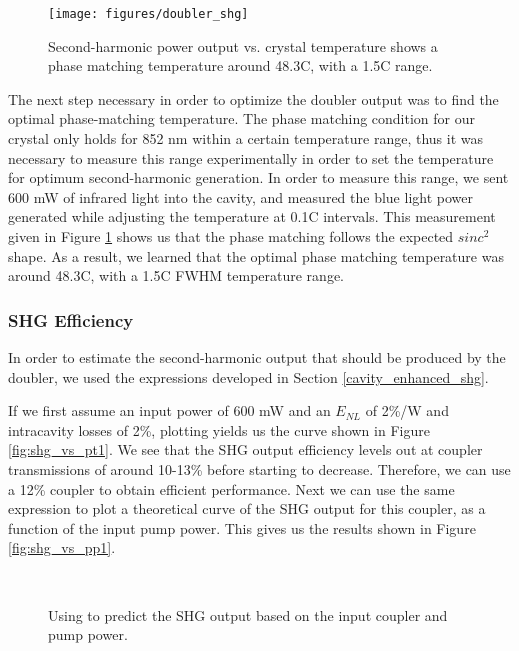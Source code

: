 \begin{figure}[!ht] 
 \centering 
 \texttt{[image: figures/doubler\_shg]} 
 \caption[SHG output vs. temperature]{Second-harmonic power output vs. crystal temperature shows a phase matching temperature around 48.3\textdegree C, with a 1.5\textdegree C range.} 
 \label{fig:doubler_shg} 
\end{figure}

 
The next step necessary in order to optimize the doubler output was to find the optimal phase-matching temperature.  The phase matching condition for our crystal only holds for 852 nm within a certain temperature range,  thus it was necessary to measure this range experimentally in order to set the temperature for optimum second-harmonic generation.  In order to measure this range, we sent 600 mW of infrared light into the cavity, and measured the blue light power generated while adjusting the temperature at 0.1\textdegree C intervals.  This measurement given in Figure \ref{fig:doubler_shg} shows us that the phase matching follows the expected $sinc^2$ shape.  As a result, we learned that the optimal phase matching temperature was around 48.3\textdegree C, with a 1.5\textdegree C FWHM temperature range.  

       

\subsubsection{SHG Efficiency}
\label{shg_efficiency} 

In order to estimate the second-harmonic output that should be produced by the
doubler, we used the expressions developed in Section
\ref{cavity_enhanced_shg}.

If we first assume an input power of 600 mW and an $E_{NL}$ of 2\%/W and
intracavity losses of 2\%, plotting  yields us the curve shown
in Figure \ref{fig:shg_vs_pt1}.  We see that the SHG output efficiency levels
out at coupler transmissions of around 10-13\% before starting to decrease.  Therefore, we can use a 12\% coupler to obtain efficient performance.  Next we can use the same expression to plot a theoretical curve of the SHG output for this coupler, as a function of the input pump power.  This gives us the results shown in Figure \ref{fig:shg_vs_pp1}.

\begin{figure}[!ht]
  \centering
   \\
  \caption[SHG output efficiency vs input coupler and pump power]{Using
 to predict the SHG output based on the input coupler and pump
power.} 
  \label{fig:sorenson}
\end{figure}

